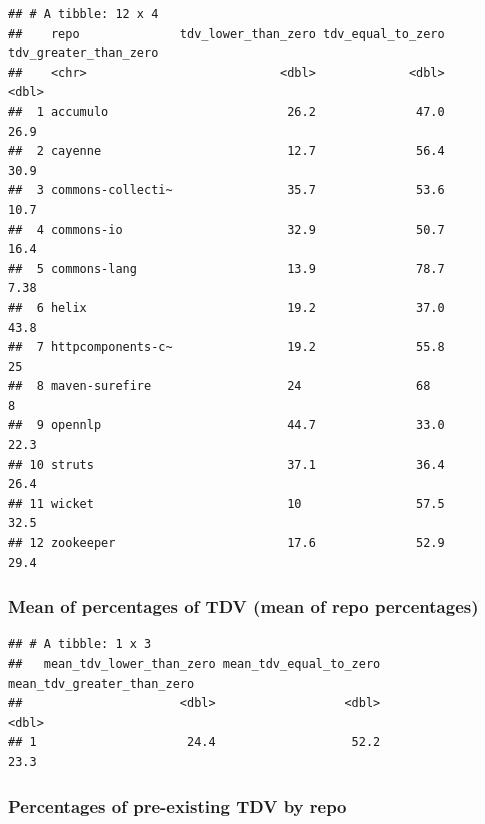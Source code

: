 \documentclass[
]{article}
\begin{document}
\begin{verbatim}
## # A tibble: 12 x 4
##    repo              tdv_lower_than_zero tdv_equal_to_zero tdv_greater_than_zero
##    <chr>                           <dbl>             <dbl>                 <dbl>
##  1 accumulo                         26.2              47.0                 26.9 
##  2 cayenne                          12.7              56.4                 30.9 
##  3 commons-collecti~                35.7              53.6                 10.7 
##  4 commons-io                       32.9              50.7                 16.4 
##  5 commons-lang                     13.9              78.7                  7.38
##  6 helix                            19.2              37.0                 43.8 
##  7 httpcomponents-c~                19.2              55.8                 25   
##  8 maven-surefire                   24                68                    8   
##  9 opennlp                          44.7              33.0                 22.3 
## 10 struts                           37.1              36.4                 26.4 
## 11 wicket                           10                57.5                 32.5 
## 12 zookeeper                        17.6              52.9                 29.4
\end{verbatim}

\subsubsection{Mean of percentages of TDV (mean of repo
percentages)}\label{mean-of-percentages-of-tdv-mean-of-repo-percentages}

\begin{verbatim}
## # A tibble: 1 x 3
##   mean_tdv_lower_than_zero mean_tdv_equal_to_zero mean_tdv_greater_than_zero
##                      <dbl>                  <dbl>                      <dbl>
## 1                     24.4                   52.2                       23.3
\end{verbatim}

\subsubsection{Percentages of pre-existing TDV by
repo}\label{percentages-of-pre-existing-tdv-by-repo}
\end{document}
